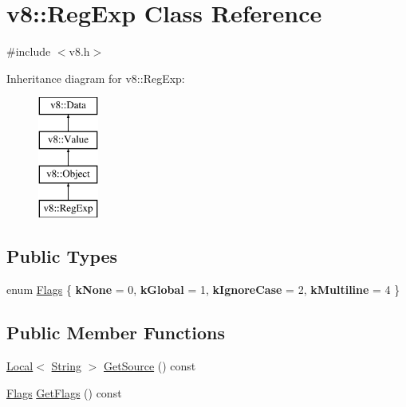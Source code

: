 \hypertarget{classv8_1_1_reg_exp}{}\section{v8\+:\+:Reg\+Exp Class Reference}
\label{classv8_1_1_reg_exp}


{\ttfamily \#include $<$v8.\+h$>$}

Inheritance diagram for v8\+:\+:Reg\+Exp\+:\begin{figure}[H]
\begin{center}
\leavevmode
\includegraphics[height=4.000000cm]{classv8_1_1_reg_exp}
\end{center}
\end{figure}
\subsection*{Public Types}
\begin{DoxyCompactItemize}
\item 
enum \hyperlink{classv8_1_1_reg_exp_aa4718a5c1f18472aff3bf51ed694fc5a}{Flags} \{ {\bfseries k\+None} = 0, 
{\bfseries k\+Global} = 1, 
{\bfseries k\+Ignore\+Case} = 2, 
{\bfseries k\+Multiline} = 4
 \}
\end{DoxyCompactItemize}
\subsection*{Public Member Functions}
\begin{DoxyCompactItemize}
\item 
\hyperlink{classv8_1_1_local}{Local}$<$ \hyperlink{classv8_1_1_string}{String} $>$ \hyperlink{classv8_1_1_reg_exp_a448213f2a92d964ed260b51429d5e590}{Get\+Source} () const 
\item 
\hyperlink{classv8_1_1_reg_exp_aa4718a5c1f18472aff3bf51ed694fc5a}{Flags} \hyperlink{classv8_1_1_reg_exp_ad5a5e77e6e626b3c7c69eef7ba2908cc}{Get\+Flags} () const 
\end{DoxyCompactItemize}
